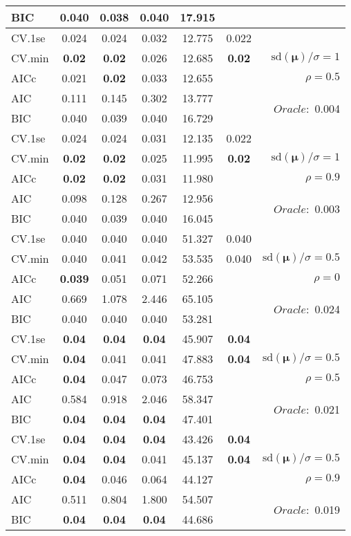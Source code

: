 \begin{table}
\begin{center}
\begin{tabular}{l*{5}{c}|r}
BIC & 0.040 & 0.038 & 0.040 & 17.915 & &  \\
 \hline 
CV.1se & 0.024 & 0.024 & 0.032 & 12.775 & 0.022 & \\
CV.min & {\bf 0.02} & {\bf 0.02} & 0.026 & 12.685 & {\bf 0.02} &  $\mathrm{sd}(\mathbf{\mu})/\sigma=1$ \\
AICc & 0.021 & {\bf 0.02} & 0.033 & 12.655 & & $\rho=0.5$ \\
AIC & 0.111 & 0.145 & 0.302 & 13.777 & &  \multirow{2}{*}{$Oracle: $ 0.004} \\
BIC & 0.040 & 0.039 & 0.040 & 16.729 & &  \\
 \hline 
CV.1se & 0.024 & 0.024 & 0.031 & 12.135 & 0.022 & \\
CV.min & {\bf 0.02} & {\bf 0.02} & 0.025 & 11.995 & {\bf 0.02} &  $\mathrm{sd}(\mathbf{\mu})/\sigma=1$ \\
AICc & {\bf 0.02} & {\bf 0.02} & 0.031 & 11.980 & & $\rho=0.9$ \\
AIC & 0.098 & 0.128 & 0.267 & 12.956 & &  \multirow{2}{*}{$Oracle: $ 0.003} \\
BIC & 0.040 & 0.039 & 0.040 & 16.045 & &  \\
 \hline 
CV.1se & 0.040 & 0.040 & 0.040 & 51.327 & 0.040 & \\
CV.min & 0.040 & 0.041 & 0.042 & 53.535 & 0.040 &  $\mathrm{sd}(\mathbf{\mu})/\sigma=0.5$ \\
AICc & {\bf 0.039} & 0.051 & 0.071 & 52.266 & & $\rho=0$ \\
AIC & 0.669 & 1.078 & 2.446 & 65.105 & &  \multirow{2}{*}{$Oracle: $ 0.024} \\
BIC & 0.040 & 0.040 & 0.040 & 53.281 & &  \\
 \hline 
CV.1se & {\bf 0.04} & {\bf 0.04} & {\bf 0.04} & 45.907 & {\bf 0.04} & \\
CV.min & {\bf 0.04} & 0.041 & 0.041 & 47.883 & {\bf 0.04} &  $\mathrm{sd}(\mathbf{\mu})/\sigma=0.5$ \\
AICc & {\bf 0.04} & 0.047 & 0.073 & 46.753 & & $\rho=0.5$ \\
AIC & 0.584 & 0.918 & 2.046 & 58.347 & &  \multirow{2}{*}{$Oracle: $ 0.021} \\
BIC & {\bf 0.04} & {\bf 0.04} & {\bf 0.04} & 47.401 & &  \\
 \hline 
CV.1se & {\bf 0.04} & {\bf 0.04} & {\bf 0.04} & 43.426 & {\bf 0.04} & \\
CV.min & {\bf 0.04} & {\bf 0.04} & 0.041 & 45.137 & {\bf 0.04} &  $\mathrm{sd}(\mathbf{\mu})/\sigma=0.5$ \\
AICc & {\bf 0.04} & 0.046 & 0.064 & 44.127 & & $\rho=0.9$ \\
AIC & 0.511 & 0.804 & 1.800 & 54.507 & &  \multirow{2}{*}{$Oracle: $ 0.019} \\
BIC & {\bf 0.04} & {\bf 0.04} & {\bf 0.04} & 44.686 & &  \\
 \hline 
\end{tabular}
\end{center}
\vspace{-1cm}
\end{table}




